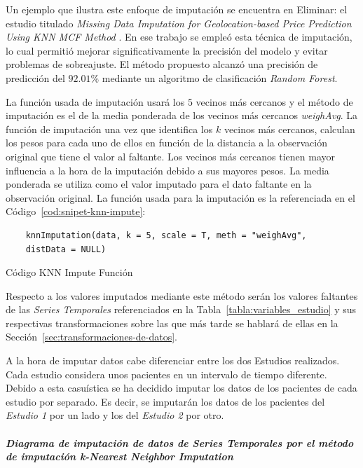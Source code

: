 Un ejemplo que ilustra este enfoque de imputación se encuentra en {\color{red} Eliminar: el estudio titulado \textit{Missing Data Imputation for Geolocation-based Price Prediction Using KNN MCF Method}} \cite{Sanjar2020}. En ese trabajo se empleó esta técnica de imputación, lo cual permitió mejorar significativamente la precisión del modelo y evitar problemas de sobreajuste. El método propuesto alcanzó una precisión de predicción del $92.01$\% mediante un  algoritmo de clasificación \textit{Random Forest}.

La función usada de imputación usará los $5$ vecinos más cercanos y el método de imputación es el de la media ponderada de los vecinos más cercanos \textit{weighAvg}. La función de imputación una vez que identifica los $k$ vecinos más cercanos, calculan los pesos para cada uno de ellos en función de la distancia a la observación original que tiene el valor al faltante. Los vecinos más cercanos tienen mayor influencia a la hora de la imputación debido a sus mayores pesos. La media ponderada se utiliza como el valor imputado para el dato faltante en la observación original. La función usada para la imputación es la referenciada en el Código~\ref{cod:snipet-knn-impute}:

\begin{code}[H]
\begin{lstlisting}
    knnImputation(data, k = 5, scale = T, meth = "weighAvg",
    distData = NULL)
\end{lstlisting}
\caption{Código KNN Impute Función}
\label{cod:snipet-knn-impute}
\end{code}

Respecto a los valores imputados mediante este método serán los valores faltantes de las \textit{Series Temporales} referenciados en la Tabla~\ref{tabla:variables_estudio} y sus respectivas transformaciones sobre las que más tarde se hablará de ellas en la Sección~\ref{sec:transformaciones-de-datos}. 

A la hora de imputar datos cabe diferenciar entre los dos Estudios realizados. Cada estudio considera unos pacientes en un intervalo de tiempo diferente. Debido a esta casuística se ha decidido imputar los datos de los pacientes de cada estudio por separado. Es decir, se imputarán los datos de los pacientes del \textit{Estudio 1} por un lado y los del \textit{Estudio 2} por otro.

\subparagraph*{Diagrama de imputación de datos de \textit{Series Temporales} por el método de imputación \textit{k-Nearest Neighbor Imputation}}\label{sec:diagrama-imputacion-knn} \\

